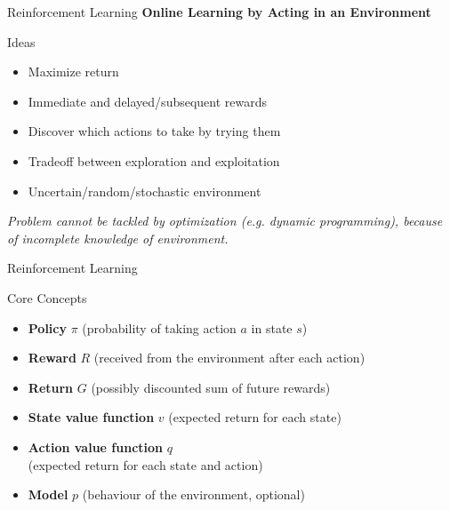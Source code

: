 \documentclass[ignorenonframetext,xcolor=x11names]{beamer}
\begin{document}
\begin{frame}[label=full]{Reinforcement Learning}
\centering  \textbf{Online Learning by Acting in an Environment}
\vspace{\baselineskip}  
\begin{block}{Ideas}
\begin{itemize}
   \item Maximize return
   \item Immediate and delayed/subsequent rewards
   \item Discover which actions to take by trying them
   \item Tradeoff between exploration and exploitation
   \item Uncertain/random/stochastic environment
\end{itemize}
\end{block} 
\vspace{\baselineskip} \centering
\emph{Problem cannot be tackled by optimization (e.g. dynamic programming), because of incomplete knowledge of environment.}
\end{frame}

\begin{frame}[label=full]{Reinforcement Learning}
\begin{block}{Core Concepts}
\begin{itemize}
    \item \textbf{Policy} $\pi$ (probability of taking action $a$ in state $s$)
    \item \textbf{Reward} $R$ (received from the environment after each action)
    \item \textbf{Return} $G$ (possibly discounted sum of future rewards)
    \item \textbf{State value function} $v$ (expected return for each state)
    \item \textbf{Action value function} $q$ \\ (expected return for each state and action)
    \item \textbf{Model} $p$ (behaviour of the environment, optional)
\end{itemize}
\end{block}
\end{frame}
\end{document}
